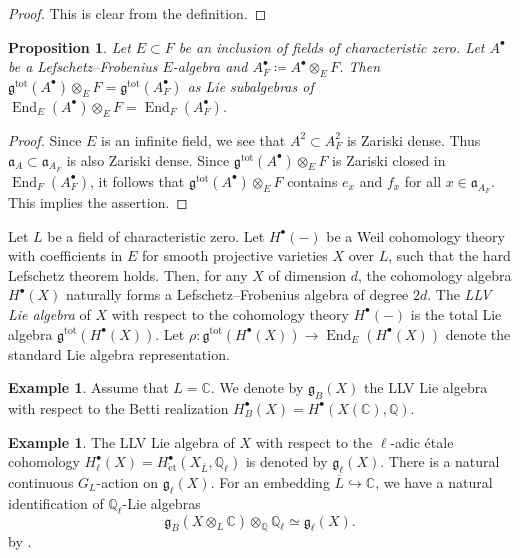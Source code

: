 \documentclass[12pt,reqno]{amsart}
\newtheorem{prop}[thm]{Proposition}
\theoremstyle{definition}
\newtheorem{ex}[thm]{Example}
\newcommand{\Q}{{\mathds Q}}
\newcommand{\C}{{\mathds C}}
\newcommand\End{\mathop{\mathrm{End}}\nolimits}
\newcommand{\et}{\mathrm{\acute{e}t}}
\newcommand{\frg}{\mathfrak{g}}
\DeclareMathOperator{\tot}{tot}
\numberwithin{equation}{section}
\begin{document}
\begin{proof}
    This is clear from the definition.
\end{proof}



\begin{prop}\label{Proposition:scalar extension of gtot}
    Let $E \subset F$ be an inclusion of fields of characteristic zero. 
    Let $A^{\bullet}$ be a Lefschetz--Frobenius $E$-algebra
    and $A^{\bullet}_F\coloneqq A^{\bullet} \otimes_E F$.
    Then
    $
    \frg^{\tot}(A^{\bullet}) \otimes_{E} F = \frg^{\tot}(A_{F}^{\bullet})
    $
    as Lie subalgebras of $\End_{E}(A^{\bullet}) \otimes_E F=\End_{F}(A^{\bullet}_F)$.
\end{prop}
\begin{proof}
    Since $E$ is an infinite field,
    we see that
    $A^2 \subset A^2_F$ is Zariski dense.
    Thus 
    $\mathfrak{a}_{A} \subset \mathfrak{a}_{A_F}$ is also Zariski dense.
    Since 
    $\frg^{\tot}(A^{\bullet}) \otimes_{E} F$
    is Zariski closed in $\End_{F}(A^{\bullet}_F)$, it follows that $\frg^{\tot}(A^{\bullet}) \otimes_{E} F$
    contains $e_x$ and $f_x$ for all $x \in \mathfrak{a}_{A_F}$. This implies the assertion.
\end{proof}

Let $L$ be a field of characteristic zero.
Let $H^{\bullet}(-)$ be a Weil cohomology theory with coefficients in $E$
for smooth projective varieties $X$ over $L$, such that the hard Lefschetz theorem holds. Then, for any $X$ of dimension $d$, the cohomology algebra $H^{\bullet}(X)$ naturally forms a Lefschetz--Frobenius algebra of degree $2d$.
The \emph{LLV Lie algebra} of $X$ with respect to the cohomology theory $H^{\bullet}(-)$ is the total Lie algebra 
$\frg^{\tot}(H^{\bullet}(X))$.
Let
$\rho \colon \frg^{\tot}(H^{\bullet}(X)) \to \End_{E}(H^{\bullet}(X))$
denote the standard Lie algebra representation.



\begin{ex}\label{Example:Betti LLV}
    Assume that $L=\C$.
    We denote by $\frg_B(X)$ the LLV Lie algebra with respect to the Betti realization
    $H^{\bullet}_B(X)=H^{\bullet}(X(\C), \Q)$.
\end{ex}

\begin{ex}\label{Example:etale LLV}
    The LLV Lie algebra of $X$ with respect to the $\ell$-adic étale cohomology
    {$H^\bullet_\ell(X)=
    H_{\et}^{\bullet}(X_{\overline{L}},\Q_{\ell})$} is denoted by $\frg_\ell(X)$.
    There is a natural continuous $G_L$-action on $\frg_\ell(X)$.
    For an embedding $\overline{L} \hookrightarrow \C$, we have a natural identification of $\Q_{\ell}$-Lie algebras
    \begin{equation}\label{eq:BettiEtaleCompare}
    \frg_B(X  \otimes_L \C ) \otimes_{\Q} \Q_{\ell} \simeq \frg_\ell(X).
    \end{equation}
    by .
\end{ex}
\end{document}
